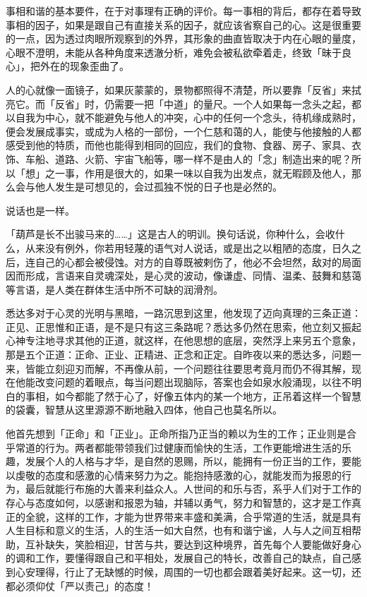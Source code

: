 \documentclass[12pt,twoside,openany]{book}
\begin{document}
事相和谐的基本要件，在于对事理有正确的评价。每一事相的背后，都存在着导致事相的因子，如果是跟自己有直接关系的因子，就应该省察自己的心。这是很重要的一点，因为透过肉眼所观察到的外界，其形象的曲直皆取决于内在心眼的量度，心眼不澄明，未能从各种角度来透澈分析，难免会被私欲牵着走，终致「昧于良心」，把外在的现象歪曲了。

人的心就像一面镜子，如果灰蒙蒙的，景物都照得不清楚，所以要靠「反省」来拭亮它。而「反省」时，仍需要一把「中道」的量尺。一个人如果每一念头之起，都以自我为中心，就不能避免与他人的冲突，心中的任何一个念头，待机缘成熟时，便会发展成事实，或成为人格的一部份，一个仁慈和蔼的人，能使与他接触的人都感受到他的特质，而他也能得到相同的回应，我们的食物、食器、房子、家具、衣饰、车船、道路、火箭、宇宙飞船等，哪一样不是由人的「念」制造出来的呢？所以「想」之一事，作用是很大的，如果一味以自我为出发点，就无暇顾及他人，那么会与他人发生是可想见的，会过孤独不悦的日子也是必然的。

说话也是一样。

「葫芦是长不出骏马来的……」这是古人的明训。换句话说，你种什么，会收什么，从来没有例外，你若用轻蔑的语气对人说话，或是出之以粗陋的态度，日久之后，连自己的心都会被侵蚀。对方的自尊既被剌伤了，他必不会坦然，敌对的局面因而形成，言语来自灵魂深处，是心灵的波动，像谦虚、同情、温柔、鼓舞和慈蔼等言语，是人类在群体生活中所不可缺的润滑剂。

悉达多对于心灵的光明与黑暗，一路沉思到这里，他发现了迈向真理的三条正道：正见、正思惟和正语，是不是只有这三条路呢？悉达多仍然在思索，他立刻又振起心神专注地寻求其他的正道，就这样，在他思想的底层，突然浮上来另五个意象，那是五个正道：正命、正业、正精进、正念和正定。自昨夜以来的悉达多，问题一来，皆能立刻迎刃而解，不再像从前，一个问题往往要思考竟月而仍不得其解，现在他能改变问题的着眼点，每当问题出现脑际，答案也会如泉水般涌现，以往不明白的事相，如今都能了然于心了，好像五体内的某一个地方，正吊着这样一个智慧的袋囊，智慧从这里源源不断地融入四体，他自己也莫名所以。

他首先想到「正命」和「正业」。正命所指乃正当的赖以为生的工作；正业则是合乎常道的行为。两者都能带领我们过健康而愉快的生活，工作更能增进生活的乐趣，发展个人的人格与才华，是自然的恩赐，所以，能拥有一份正当的工作，要能以虔敬的态度和感激的心情来努力为之。能抱持感激的心，就能发而为报恩的行为，最后就能行布施的大善来利益众人。人世间的和乐与否，系乎人们对于工作的存心与态度如何，以感谢和报恩为轴，并辅以勇气，努力和智慧的，这才是工作真正的全貌，这样的工作，才能为世界带来丰盛和美满，合乎常道的生活，就是具有人生目标和意义的生活，人的生活一如大自然，也有和谐宁谧，人与人之间互相帮助，互补缺失，笑脸相迎，甘苦与共，要达到这种境界，首先每个人要能做好身心的调和工作，要懂得跟自己和平相处，发展自己的特长，改善自己的缺点，自己感到心安理得，行止了无缺憾的时候，周围的一切也都会跟着美好起来。这一切，还都必须仰仗「严以责己」的态度！
\end{document}
